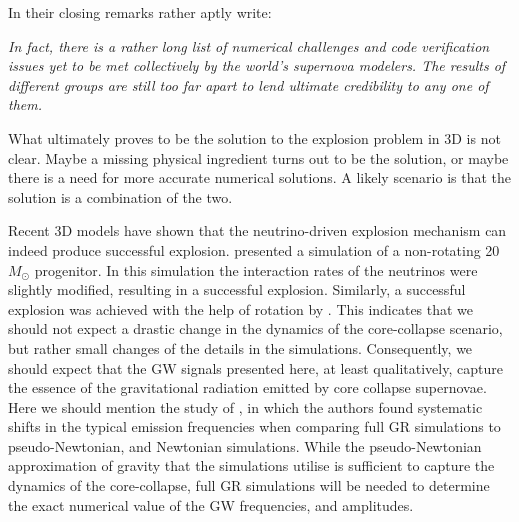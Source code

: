 In their closing remarks \cite{skinner_16} rather aptly write:
\begin{displayquote}
\textit{In fact, there is a rather long list of numerical
challenges and code verification issues yet to be met
collectively by the world’s supernova modelers. The results
of different groups are still too far apart to lend ultimate
credibility to any one of them.} 
\end{displayquote}
What ultimately proves to be the solution to the explosion problem in 3D is not clear. Maybe a
missing physical ingredient turns out to be the solution, or maybe there is a need for
more accurate numerical solutions. A likely scenario is that the solution is
a combination of the two. 

Recent 3D models have shown that the neutrino-driven explosion mechanism can indeed produce successful explosion. 
\citep{melson_15b} presented a simulation of a non-rotating 20 $M_\odot$ progenitor. In this simulation the interaction rates of the neutrinos were slightly modified, resulting in a successful explosion. 
Similarly, a successful explosion was achieved with the help of rotation by \citep{suma_models}. 
This indicates that we should not expect a drastic change in the dynamics of the core-collapse scenario, 
but rather small changes of the details in the simulations. 
Consequently, we should expect that the GW signals presented here, at least qualitatively, 
capture the essence of the gravitational radiation emitted by core collapse supernovae. Here we should mention the study of \cite{mueller_13}, in which the authors found systematic shifts in the typical emission frequencies when comparing full GR simulations to pseudo-Newtonian, and Newtonian simulations.
While the pseudo-Newtonian approximation of gravity that the simulations utilise is sufficient to capture the dynamics of the core-collapse, full
GR simulations will be needed to determine the exact numerical value of the GW frequencies, and amplitudes.

